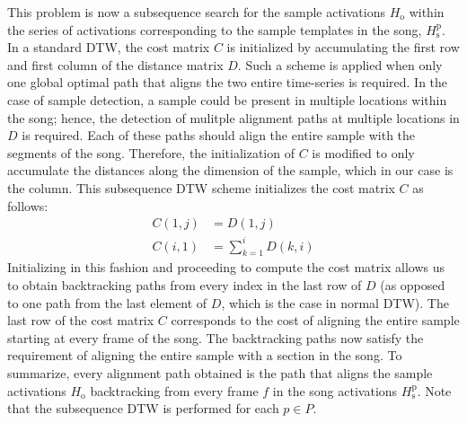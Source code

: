 \documentclass{article}
\begin{document}
This problem is now a subsequence search for the sample activations $H_\mathrm{o}$ within the series of activations corresponding to the sample templates in the song, $H_{\mathrm{s}}^{\mathrm{p}}$. %
In a standard DTW, the cost matrix $C$ is initialized by accumulating the first row and first column of the distance matrix $D$.
Such a scheme is applied when only one global optimal path that aligns the two entire time-series is required. In the case of sample detection, a sample could be present in multiple locations within the song; hence, the detection of mulitple alignment paths at multiple locations in $D$ is required. Each of these paths should align the entire sample with the segments of the song. Therefore, the initialization of $C$ is modified to only accumulate the distances along the dimension of the sample, which in our case is the column. This subsequence DTW scheme\cite{Müller2007} initializes the cost matrix $C$ as follows:
\begin{equation}
\label{cost_init_new}
\begin{aligned}
C(1,j) &= D(1,j)\\
C(i,1) &= \sum_{k=1}^{i} D(k,i)
\end{aligned}
\end{equation}
Initializing in this fashion and proceeding to compute the cost matrix allows us to obtain backtracking paths from every index in the last row of $D$ (as opposed to one path from the last element of $D$, which is the case in normal DTW). The last row of the cost matrix $C$ corresponds to the cost of aligning the entire sample starting at every frame of the song. The backtracking paths now satisfy the requirement of aligning the entire sample with a section in the song. To summarize, every alignment path obtained is the path that aligns the sample activations $H_\mathrm{o}$ backtracking from every frame $f$ in the song activations $H_{\mathrm{s}}^{\mathrm{p}}$. Note that the subsequence DTW is performed for each $p \in P$.
\end{document}
